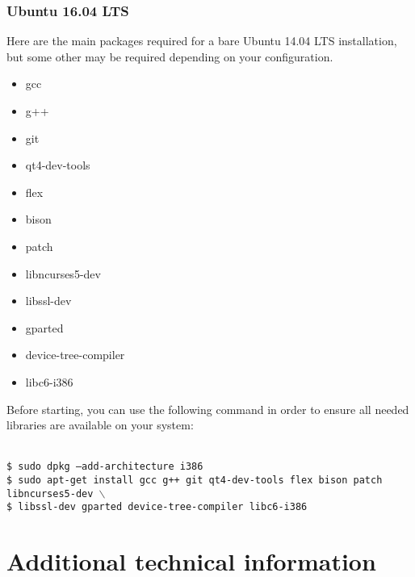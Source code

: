 \documentclass[openany,a4paper]{book}
\begin{document}
\subsection{Ubuntu 16.04 LTS}

Here are the main packages required for a bare Ubuntu 14.04 LTS installation, but some other may be required depending on your configuration.

\begin{itemize}
\setlength\parskip{0pt}
\item gcc
\item g++
\item git
\item qt4-dev-tools
\item flex
\item bison
\item patch
\item libncurses5-dev
\item libssl-dev
\item gparted
\item device-tree-compiler
\item libc6-i386
\end{itemize}

Before starting, you can use the following command in order to ensure all needed libraries are available on your system:

\begin{tabbing}
\kill \hspace{1cm} \= \\
\> \texttt{\$ sudo dpkg --add-architecture i386} \\
\> \texttt{\$ sudo apt-get install gcc g++ git qt4-dev-tools flex bison patch libncurses5-dev $\backslash$} \\
\> \texttt{\$ libssl-dev gparted device-tree-compiler libc6-i386} \\
\end{tabbing}




\chapter{Additional technical information}
\end{document}
